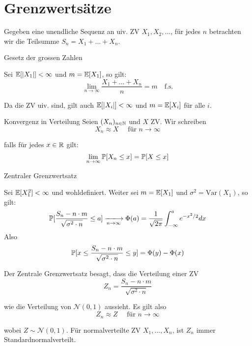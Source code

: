\section*{Grenzwertsätze}

Gegeben eine unendliche Sequenz an uiv. ZV $X_1, X_2,...$, für jedes $n$ betrachten wir die Teilsumme $S_n = X_1 + ... + X_n$.

\begin{mainbox}
    {Gesetz der grossen Zahlen}
    
    Sei $\mathbb{E}[|X_1|] < \infty$ und $m = \mathbb{E}[X_1]$, so gilt:
    $$\lim_{n \to \infty} \frac{X_1 + ... + X_n}{n} = m \quad \text{f.s.}$$
\end{mainbox}

Da die ZV uiv. sind, gilt auch $\mathbb{E}[|X_i|] < \infty$ und $m = \mathbb{E}[X_i]$ für alle $i$. \medskip

\begin{subbox}{Konvergenz in Verteilung} Seien $(X_n)_{n \in \mathbb{N}}$ und $X$ ZV. Wir schreiben
$$X_n \approx X \quad \text{ für } n \to \infty$$

falls für jedes $x \in \mathbb{R}$ gilt:
$$\lim_{n \to \infty} \mathbb{P}[X_n \leq x] = \mathbb{P}[X \leq x]$$
\end{subbox}

\begin{mainbox}
    {Zentraler Grenzwertsatz}
    
    Sei $\mathbb{E}[X^2_1] < \infty$ und wohldefiniert. Weiter sei $m = \mathbb{E}[X_1]$ und $\sigma^2 = \text{Var}(X_1)$, so gilt:
    $$\Pm[ \frac{S_n - n \cdot m}{\sqrt{\sigma^2 \cdot n}} \leq a] \xlongrightarrow[n \to \infty]{} \Phi(a) = \frac{1}{\sqrt{2 \pi}} \int_{-\infty}^a e^{-x^2 / 2} dx$$
    Also 
    $$\mathbb{P}[x \leq \frac{S_n - n \cdot m}{\sqrt{\sigma^2 \cdot n}} \leq y] = \Phi(y) - \Phi(x)$$
\end{mainbox}

Der Zentrale Grenzwertsatz besagt, dass die Verteilung einer ZV
$$Z_n = \frac{S_n - n \cdot m}{\sqrt{\sigma^2 \cdot n}}$$

wie die Verteilung von $\mathcal{N}(0,1)$ aussieht. Es gilt also
$$Z_n \approx Z \quad \text{ für } n \to \infty$$

wobei $Z \sim \mathcal{N}(0,1)$. Für normalverteilte ZV $X_1,...,X_n$, ist $Z_n$ immer Standardnormalverteilt.
